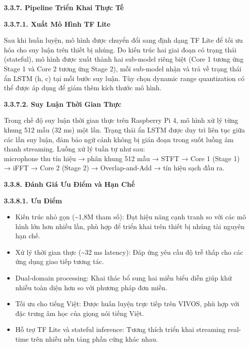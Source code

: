 \documentclass[
  13pt,
]{article}
\providecommand{\tightlist}{%
  \setlength{\itemsep}{0pt}\setlength{\parskip}{0pt}}
\begin{document}
\textbf{3.3.7. Pipeline Triển Khai Thực Tế}

\textbf{3.3.7.1. Xuất Mô Hình TF Lite}

Sau khi huấn luyện, mô hình được chuyển đổi sang định dạng TF Lite để
tối ưu hóa cho suy luận trên thiết bị nhúng. Do kiến trúc hai giai đoạn
có trạng thái (stateful), mô hình được xuất thành hai sub-model riêng
biệt (Core 1 tương ứng Stage 1 và Core 2 tương ứng Stage 2), mỗi
sub-model nhận và trả về trạng thái ẩn LSTM (h, c) tại mỗi bước suy
luận. Tùy chọn dynamic range quantization có thể được áp dụng để giảm
thêm kích thước mô hình.

\textbf{3.3.7.2. Suy Luận Thời Gian Thực}

Trong chế độ suy luận thời gian thực trên Raspberry Pi 4, mô hình xử lý
từng khung 512 mẫu (32 ms) một lần. Trạng thái ẩn LSTM được duy trì liên
tục giữa các lần suy luận, đảm bảo ngữ cảnh không bị gián đoạn trong
suốt luồng âm thanh streaming. Luồng xử lý tuần tự như sau:\\
microphone thu tín hiệu → phân khung 512 mẫu → STFT → Core 1 (Stage 1) →
iFFT → Core 2 (Stage 2) → Overlap-and-Add → tín hiệu sạch đầu ra.

\textbf{3.3.8. Đánh Giá Ưu Điểm và Hạn Chế}

\textbf{3.3.8.1. Ưu Điểm}

\begin{itemize}
\tightlist
\item
  Kiến trúc nhỏ gọn (\textasciitilde1,8M tham số): Đạt hiệu năng cạnh
  tranh so với các mô hình lớn hơn nhiều lần, phù hợp để triển khai trên
  thiết bị nhúng tài nguyên hạn chế.\\
\item
  Xử lý thời gian thực (\textasciitilde32 ms latency): Đáp ứng yêu cầu
  độ trễ thấp cho các ứng dụng giao tiếp tương tác.\\
\item
  Dual-domain processing: Khai thác bổ sung hai miền biểu diễn giúp khử
  nhiễu toàn diện hơn so với phương pháp đơn miền.\\
\item
  Tối ưu cho tiếng Việt: Được huấn luyện trực tiếp trên VIVOS, phù hợp
  với đặc trưng âm học của giọng nói tiếng Việt.\\
\item
  Hỗ trợ TF Lite và stateful inference: Tương thích triển khai streaming
  real-time trên nhiều nền tảng phần cứng khác nhau.
\end{itemize}
\end{document}

